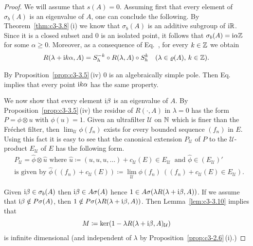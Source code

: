 \begin{proof}
	We will assume that $s(A) = 0$.
	Assuming first that every element of\/ $\sigma_{b}(A)$ is an eigenvalue of\/ $A$, one can conclude the following.
	By Theorem~\ref{thm:c3-3.8}\,(i) we know that $\sigma_{b}(A)$ is an additive subgroup of\/ $\mathrm{i}\mathbb{R} $.
	Since it is a closed subset and $0$ is an isolated point, it follows that $\sigma_{b}(A) = \mathrm{i}\alpha\mathbb{Z}$ for some $\alpha \geq 0$.
	Moreover, as a consequence of Eq.~, for every $k \in \mathbb{Z}$ we obtain
	\begin{equation}\label{eq:c3-3.15}
		R(\lambda+\im k\alpha,A) = S_{h}^{-k}\circ R(\lambda,A)\circ S_{h}^{k} \quad (\lambda \in \rho(A),\, k \in \Z).
	\end{equation}
	
	By Proposition~\ref{prop:c3-3.5}\,(iv) $0$ is an algebraically simple pole.
	Then Eq.~ implies that every point $\mathrm{i} k\alpha$ has the same property.
	
	We now show that every element $\mathrm{i}\beta$ is an eigenvalue of\/ $A$.
	By Proposition~\ref{prop:c3-3.5}\,(iv) the residue of\/ $R(\cdot,A)$ in $\lambda = 0$ has the form $P = \phi\otimes u$ with $\phi(u) = 1$.
	Given an ultrafilter $\mathcal{U}$ on $\mathbb{N}$ which is finer than the Fréchet filter, then $\lim_{\mathcal{U}}\phi(f_{n})$ exists for every bounded sequence $(f_{n})$ in $E$.
	Using this fact it is easy to see that the canonical extension $P_{\mathcal{U}}$ of\/ $P$ to the $\mathcal{U}$-product $E_{\mathcal{U}}$ of\/ $E$ has the following form.
\begin{equation}\label{eq:c3-3.16}
\begin{split}
		&P_{\mathcal{U}} = \hat{\phi}\otimes\hat{u} \text{ where } \hat{u} \coloneq (u,u,u,\ldots)+c_{\mathcal{U}}(E) \in E_{\mathcal{U}} \ \text{ and } \hat{\phi} \in (E_{\mathcal{U}})'
		\\
		&\text{is given by } \hat{\phi}((f_{n})+c_{\mathcal{U}}(E)) \coloneq \lim_{\mathcal{U}}\phi(f_{n}) \ ((f_{n})+c_{\mathcal{U}}(E) \in E_{\mathcal{U}}) .
		\end{split}
	\end{equation}
	
	Given $\mathrm{i}\beta \in \sigma_{b}(A)$ then $\mathrm{i}\beta \in A\sigma(A)$ hence $1 \in A\sigma(\lambda R(\lambda+\mathrm{i}\beta,A))$.
	If we assume that  $\mathrm{i}\beta \notin P\sigma(A)$, then $1 \notin P\sigma(\lambda R(\lambda+\mathrm{i}\beta,A))$.
	Then Lemma~\ref{lem:c3-3.10} implies that 
\[
	M \coloneq \ker(1 - \lambda R(\lambda+\mathrm{i}\beta,A)_{\mathcal{U}})
\]
%
is infinite dimensional (and independent of\/ $\lambda$ by Proposition~\ref{prop:c3-2.6}\,(i).)


\end{proof}
